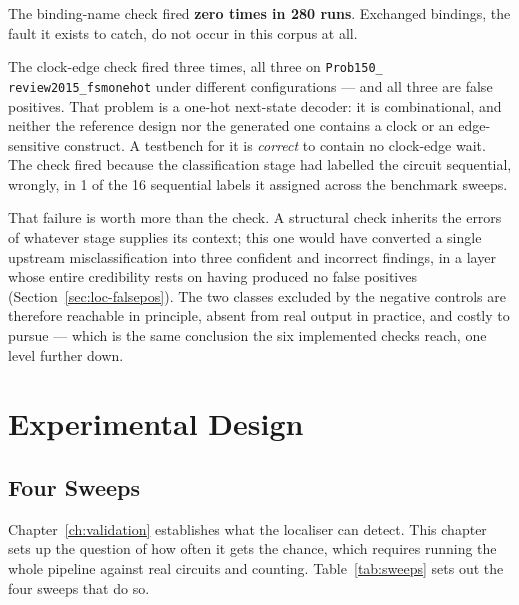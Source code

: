 \documentclass[11pt,a4paper,titlepage=false]{scrreprt}
\begin{document}
The binding-name check fired \textbf{zero times in 280 runs}. Exchanged bindings, the fault it
exists to catch, do not occur in this corpus at all.

The clock-edge check fired three times, all three on \texttt{Prob150\_\allowbreak
review2015\_\allowbreak fsmonehot} under different configurations --- and all three are false
positives. That problem is a one-hot next-state decoder: it is combinational, and neither the
reference design nor the generated one contains a clock or an edge-sensitive construct. A
testbench for it is \emph{correct} to contain no clock-edge wait. The check fired because the
classification stage had labelled the circuit sequential, wrongly, in 1 of the 16 sequential
labels it assigned across the benchmark sweeps.

That failure is worth more than the check. A structural check inherits the errors of whatever
stage supplies its context; this one would have converted a single upstream misclassification
into three confident and incorrect findings, in a layer whose entire credibility rests on
having produced no false positives (Section~\ref{sec:loc-falsepos}). The two classes excluded
by the negative controls are therefore reachable in principle, absent from real output in
practice, and costly to pursue --- which is the same conclusion the six implemented checks
reach, one level further down.

\chapter{Experimental Design}\label{ch:experiment}

\section{Four Sweeps}\label{sec:exp-sweeps}

Chapter~\ref{ch:validation} establishes what the localiser can detect. This chapter sets up
the question of how often it gets the chance, which requires running the whole pipeline
against real circuits and counting. Table~\ref{tab:sweeps} sets out the four sweeps that do so.
\end{document}
